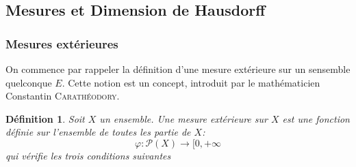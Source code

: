 \documentclass[12pt,a4paper]{report}
\theoremstyle{plain}
\newtheorem{definition}{Définition}
\begin{document}
	\subsection{Mesures et Dimension de Hausdorff}
	\subsubsection{Mesures extérieures}
On commence par rappeler la définition d'une mesure extérieure sur un sensemble quelconque $E$. Cette notion est un concept, introduit par le mathématicien Constantin \textsc{Carathéodory}. 

\begin{definition}
Soit $X$ un ensemble. Une mesure extérieure sur $X$ est une fonction définie sur l'ensemble de toutes les partie de $X$:
\[\varphi : \mathcal{P}(X) \longrightarrow [0, +\infty\]
qui vérifie les trois conditions suivantes
\end{definition}
\end{document}

